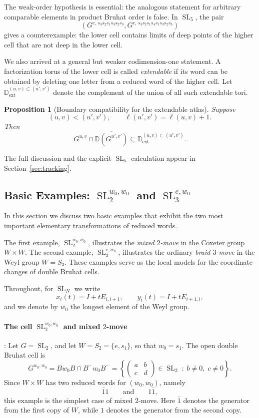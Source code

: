 \documentclass[12pt]{amsart}
\newcommand{\D}{\mathbb D}
\newcommand{\SL}{\operatorname{SL}}
\theoremstyle{plain}
\newtheorem{proposition}[theorem]{Proposition}
\theoremstyle{definition}
\theoremstyle{remark}
\begin{document}
The weak-order hypothesis is essential: the analogous statement for arbitrary comparable elements in product Bruhat order is false.  In $\SL_5$, the pair
\[
\left(
G^{e,\,s_3s_2s_1s_3s_2s_3},
G^{e,\,s_3s_2s_1s_4s_1s_3s_2s_3}
\right)
\]
gives a counterexample: the lower cell contains limits of deep points of the higher cell that are not deep in the lower cell.

We also arrived at a general but weaker codimension-one statement.  A factorization torus of the lower cell is called \emph{extendable} if its word can be obtained by deleting one letter from a reduced word of the higher cell.  Let $\D_{\mathrm{ext}}^{(u,v)\subset(u',v')}$ denote the complement of the union of all such extendable tori.

\begin{proposition}[Boundary compatibility for the extendable atlas]
\label{prop:intro_boundary_extendable}
Suppose
\[
(u,v)<(u',v'),\qquad
\ell(u',v')=\ell(u,v)+1.
\]
Then
\[
G^{u,v}\cap\overline{\D(G^{u',v'})}
\subseteq
\D_{\mathrm{ext}}^{(u,v)\subset(u',v')}.
\]
\end{proposition}

The full discussion and the explicit $\SL_5$ calculation appear in Section~\ref{sec:tracking}.

\subsection{Basic Examples: \texorpdfstring{$\SL_2^{w_0,w_0}$ and $\SL_3^{e,w_0}$}{SL2 and SL3}}

In this section we discuss two basic examples that exhibit the two most important elementary transformations of reduced words. 

The first example, $\SL_2^{w_0,w_0}$, illustrates the \emph{mixed $2$-move} in the Coxeter group $W\times W$. 
The second example, $\SL_3^{e,w_0}$, illustrates the ordinary \emph{braid $3$-move} in the Weyl group $W=S_3$. 
These examples serve as the local models for the coordinate changes of double Bruhat cells.

Throughout, for $\SL_N$ we write
\[
x_i(t)=I+tE_{i,i+1}, \qquad y_i(t)=I+tE_{i+1,i},
\]
and we denote by $w_0$ the longest element of the Weyl group.
\medskip

\paragraph{\bf The cell $\SL_2^{w_0,w_0}$ and mixed $2$-move}: Let $G=\SL_2$, and let $W=S_2=\{e,s_1\}$, so that $w_0=s_1$. 
The open double Bruhat cell is
\[
G^{w_0,w_0}=B w_0 B \cap B^- w_0 B^- 
=\left\{
\begin{pmatrix} a & b \\ c & d \end{pmatrix}\in \SL_2 \;:\; b\neq 0,\; c\neq 0
\right\}.
\]
Since $W\times W$ has two reduced words for $(w_0,w_0)$, namely
\[
\bar{1}1
\qquad\text{and}\qquad
1\bar{1},
\]
this example is the simplest case of mixed $2$-move. Here $\bar{1}$ denotes the generator from the first copy of $W$, while $1$ denotes the generator from the second copy.
\end{document}
